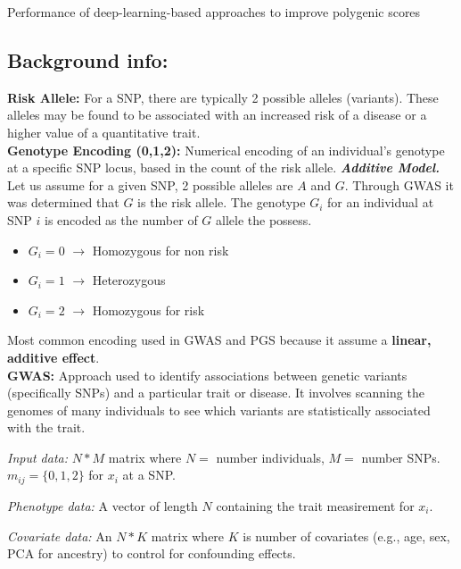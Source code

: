 \documentclass[twocolumn]{article}
\begin{document}
\begin{literaturepaper}{Performance of deep-learning-based approaches to improve polygenic scores \cite{Kelemen2025PolygenicScores}}
\label{paper-summary-3}
\small
\subsection*{Background info:} 
\textbf{Risk Allele:} For a SNP, there are typically 2 possible alleles (variants). These alleles may be found to be associated with an increased risk of a disease or a higher value of a quantitative trait. \\

\textbf{Genotype Encoding (0,1,2):} Numerical encoding of an individual's genotype at a specific SNP locus, based in the count of the risk allele. \textbf{\textit{Additive Model.}}\\

Let us assume for a given SNP, 2 possible alleles are $A$ and $G$. Through GWAS it was determined that $G$ is the risk allele. The genotype $G_i$ for an individual at SNP $i$ is encoded as the number of $G$ allele the possess.

\begin{itemize}
    \item $G_i = 0$ $\rightarrow$ Homozygous for non risk
    \item $G_i =1$ $\rightarrow$ Heterozygous 
    \item $G_i = 2$ $\rightarrow$ Homozygous for risk
\end{itemize}

Most common encoding used in GWAS and PGS because it assume a \textbf{linear, additive effect}. \\

\textbf{GWAS:} Approach used to identify associations between genetic variants (specifically SNPs) and a particular trait or disease. It involves scanning the genomes of many individuals to see which variants are statistically associated with the trait.

\textit{Input data:} $N*M$ matrix where $N =$ number individuals, $M =$ number SNPs. $m_{ij} = \{0,1,2\}$ for $x_i$ at a SNP.

\textit{Phenotype data:} A vector of length $N$ containing the trait measirement for $x_i$.

\textit{Covariate data:} An $N*K$ matrix where $K$ is number of covariates (e.g., age, sex, PCA for ancestry) to control for confounding effects.


\end{literaturepaper}
\end{document}
